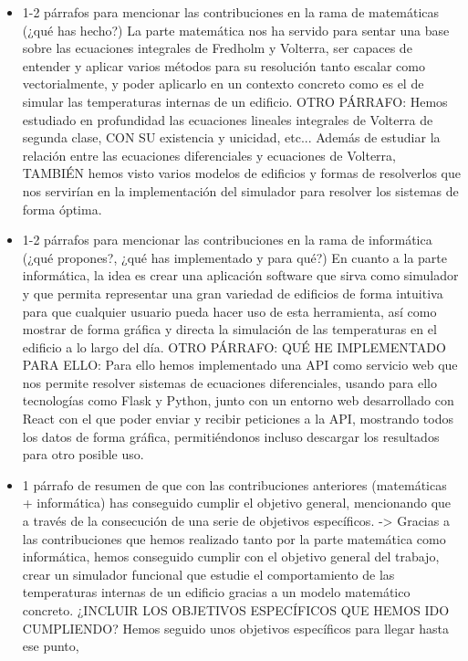 \begin{itemize}
	\item 1-2 párrafos para mencionar las contribuciones en la rama de matemáticas (¿qué has hecho?) La parte matemática nos ha servido para sentar una base sobre las ecuaciones integrales de Fredholm y Volterra, ser capaces de entender y aplicar varios métodos para su resolución tanto escalar como vectorialmente, y poder aplicarlo en un contexto concreto como es el de simular las temperaturas internas de un edificio. OTRO PÁRRAFO: Hemos estudiado en profundidad las ecuaciones lineales integrales de Volterra de segunda clase, CON SU existencia y unicidad, etc... Además de estudiar la relación entre las ecuaciones diferenciales y ecuaciones de Volterra, TAMBIÉN hemos visto varios modelos de edificios y formas de resolverlos que nos servirían en la implementación del simulador para resolver los sistemas de forma óptima.
	\item 1-2 párrafos para mencionar las contribuciones en la rama de informática (¿qué propones?, ¿qué has implementado y para qué?) En cuanto a la parte informática, la idea es crear una aplicación software que sirva como simulador y que permita representar una gran variedad de edificios de forma intuitiva para que cualquier usuario pueda hacer uso de esta herramienta, así como mostrar de forma gráfica y directa la simulación de las temperaturas en el edificio a lo largo del día. OTRO PÁRRAFO: QUÉ HE IMPLEMENTADO PARA ELLO: Para ello hemos implementado una API como servicio web que nos permite resolver sistemas de ecuaciones diferenciales, usando para ello tecnologías como Flask y Python, junto con un entorno web desarrollado con React con el que poder enviar y recibir peticiones a la API, mostrando todos los datos de forma gráfica, permitiéndonos incluso descargar los resultados para otro posible uso.
	\item 1 párrafo de resumen de que con las contribuciones anteriores (matemáticas + informática) has conseguido cumplir el objetivo general, mencionando que a través de la consecución de una serie de objetivos específicos. -> Gracias a las contribuciones que hemos realizado tanto por la parte matemática como informática, hemos conseguido cumplir con el objetivo general del trabajo, crear un simulador funcional que estudie el comportamiento de las temperaturas internas de un edificio gracias a un modelo matemático concreto. ¿INCLUIR LOS OBJETIVOS ESPECÍFICOS QUE HEMOS IDO CUMPLIENDO? Hemos seguido unos objetivos específicos para llegar hasta ese punto, 
\end{itemize}
